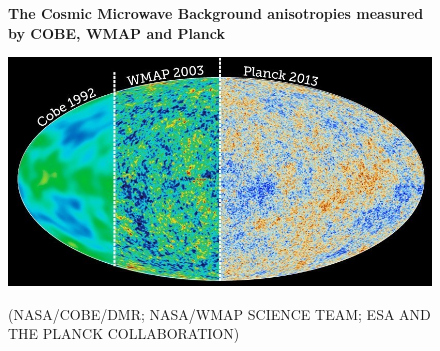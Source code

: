 \documentclass{article}
\begin{document}
\begin{figure}[h]
\centering
    \textbf{The Cosmic Microwave Background anisotropies measured by COBE, WMAP and Planck}\par\medskip
\centering
   {\includegraphics[width=.65\textwidth]{cmb1.jpg}}


\caption{(NASA/COBE/DMR; NASA/WMAP SCIENCE TEAM; ESA AND THE PLANCK COLLABORATION)}
\label{cobe_wmap_planck}
\end{figure}
\end{document}
